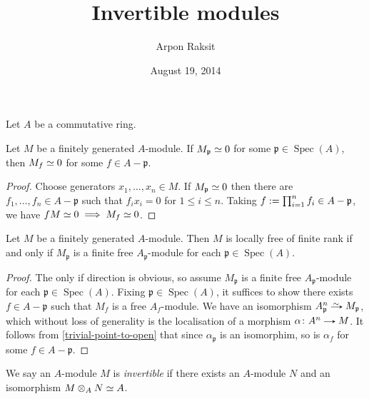

\title{Invertible modules}
\author{Arpon Raksit}
\date{August 19, 2014}


\maketitle
\thispagestyle{fancy}


\begin{notation}
  Let $A$ be a commutative ring.
\end{notation}

\newcommand{\p}{\mathfrak{p}}
\newcommand{\Spec}{\operatorname{Spec}}

\begin{lemma}
  \label{trivial-point-to-open}
  Let $M$ be a finitely generated $A$-module. If $M_\p \iso 0$ for
  some $\p \in \Spec(A)$, then $M_f \simeq 0$ for some $f \in A - \p$.
\end{lemma}

\begin{proof}
  Choose generators $x_1,\ldots,x_n \in M$. If $M_\p \iso 0$ then
  there are $f_1,\ldots,f_n \in A - \p$ such that $f_ix_i = 0$ for $1
  \le i \le n$. Taking $f \ce \prod_{i=1}^n f_i \in A - \p$, we have
  $fM \simeq 0 \implies M_f \simeq 0$.
\end{proof}

\begin{lemma}
  \label{locally-free-point-to-open}
  Let $M$ be a finitely generated $A$-module. Then $M$ is locally free
  of finite rank if and only if $M_\p$ is a finite free $A_\p$-module
  for each $\p \in \Spec(A)$.
\end{lemma}

\begin{proof}
  The only if direction is obvious, so assume $M_\p$ is a finite free
  $A_\p$-module for each $\p \in \Spec(A)$. Fixing $\p \in \Spec(A)$,
  it suffices to show there exists $f \in A - \p$ such that $M_f$ is a
  free $A_f$-module. We have an isomorphism $A_\p^n \isoto M_\p$,
  which without loss of generality is the localisation of a morphism
  $\alpha \c A^n \to M$. It follows from \eqref{trivial-point-to-open}
  that since $\alpha_\p$ is an isomorphim, so is $\alpha_f$ for some
  $f \in A - \p$.
\end{proof}

\begin{definition}
  We say an $A$-module $M$ is \emph{invertible} if there exists an
  $A$-module $N$ and an isomorphism $M \otimes_A N \simeq A$.
\end{definition}

